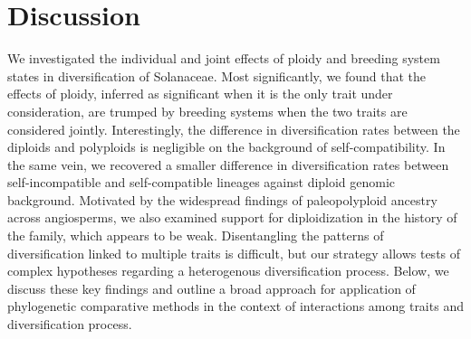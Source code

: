 \section{Discussion}

%
%
% 
%

We investigated the individual and joint effects of ploidy and breeding system states in diversification of Solanaceae.
Most significantly, we found that the effects of ploidy, inferred as significant when it is the only trait under consideration, are trumped by breeding systems when the two traits are considered jointly.  %
Interestingly, the difference in diversification rates between the diploids and polyploids is negligible on the background of self-compatibility.
In the same vein, we recovered a smaller difference in diversification rates between self-incompatible and self-compatible lineages against diploid genomic background. %
Motivated by the widespread findings of paleopolyploid ancestry across angiosperms, we also examined support for diploidization in the history of the family, which appears to be weak. %
Disentangling the patterns of diversification linked to multiple traits is difficult, but our strategy allows tests of complex hypotheses regarding a heterogenous diversification process.
Below, we discuss these key findings and outline a broad approach for application of phylogenetic comparative methods in the context of interactions among traits and diversification process. 


